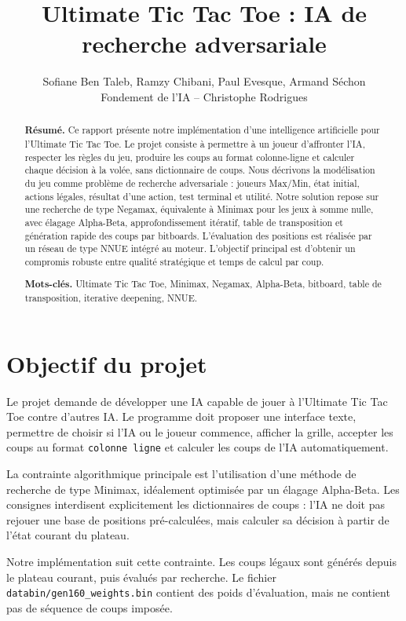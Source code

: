\documentclass{pssbmac}
\begin{document}
\title{Ultimate Tic Tac Toe : IA de recherche adversariale}

\author{
    {\large Sofiane Ben Taleb, Ramzy Chibani, Paul Evesque, Armand Séchon}\\ [1em]
    {\normalsize Fondement de l'IA -- Christophe Rodrigues}
}
\criartitulo

\begin{abstract}
{\bf Résumé.} Ce rapport présente notre implémentation d'une intelligence artificielle pour l'Ultimate Tic Tac Toe. Le projet consiste à permettre à un joueur d'affronter l'IA, respecter les règles du jeu, produire les coups au format colonne-ligne et calculer chaque décision à la volée, sans dictionnaire de coups. Nous décrivons la modélisation du jeu comme problème de recherche adversariale : joueurs Max/Min, état initial, actions légales, résultat d'une action, test terminal et utilité. Notre solution repose sur une recherche de type Negamax, équivalente à Minimax pour les jeux à somme nulle, avec élagage Alpha-Beta, approfondissement itératif, table de transposition et génération rapide des coups par bitboards. L'évaluation des positions est réalisée par un réseau de type NNUE intégré au moteur. L'objectif principal est d'obtenir un compromis robuste entre qualité stratégique et temps de calcul par coup.

\noindent
{\bf Mots-clés.} Ultimate Tic Tac Toe, Minimax, Negamax, Alpha-Beta, bitboard, table de transposition, iterative deepening, NNUE.
\end{abstract}

\section{Objectif du projet}

Le projet demande de développer une IA capable de jouer à l'Ultimate Tic Tac Toe contre d'autres IA. Le programme doit proposer une interface texte, permettre de choisir si l'IA ou le joueur commence, afficher la grille, accepter les coups au format \texttt{colonne ligne} et calculer les coups de l'IA automatiquement.

La contrainte algorithmique principale est l'utilisation d'une méthode de recherche de type Minimax, idéalement optimisée par un élagage Alpha-Beta. Les consignes interdisent explicitement les dictionnaires de coups : l'IA ne doit pas rejouer une base de positions pré-calculées, mais calculer sa décision à partir de l'état courant du plateau.

Notre implémentation suit cette contrainte. Les coups légaux sont générés depuis le plateau courant, puis évalués par recherche. Le fichier \texttt{databin/gen160\_weights.bin} contient des poids d'évaluation, mais ne contient pas de séquence de coups imposée.
\end{document}

